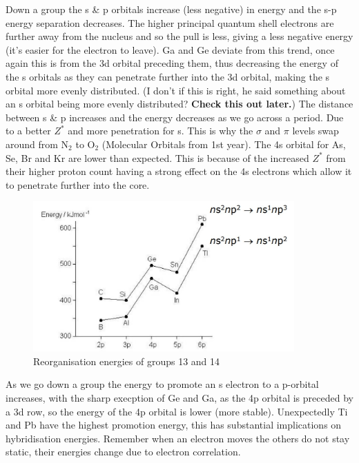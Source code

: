 \documentclass{article}
\begin{document}
    Down a group the s \& p orbitals increase (less negative) in energy and the s-p energy separation decreases.
    The higher principal quantum shell electrons are further away from the nucleus and so the pull is less, giving
    a less negative energy (it's easier for the electron to leave). Ga and Ge deviate from this trend, once again
    this is from the 3d orbital preceding them, thus decreasing the energy of the s orbitals as they can penetrate
    further into the 3d orbital, making the s orbital more evenly distributed. (I don't if this is right, he said something about an s orbital being more evenly 
    distributed? \textbf{Check this out later.}) The distance between s \& p increases and the energy decreases as 
    we go across a period. Due to a better \(Z^*\) and more penetration for s. This is why the \(\sigma\) and \(\pi\)
    levels swap around from N\(_2\) to O\(_2\) (Molecular Orbitals from 1st year). The 4s orbital for As, Se, Br and
    Kr are lower than expected. This is because of the increased \(Z^*\) from their higher proton count having a strong
    effect on the 4s electrons which allow it to penetrate further into the core.  
    
    \begin{figure}[h]
        \centering
        \includegraphics[width=10cm]{trans.jpg}
        \caption{Reorganisation energies of groups 13 and 14}
    \end{figure}

    As we go down a group the energy to promote an s electron to a p-orbital increases, with the sharp execption of 
    Ge and Ga, as the 4p orbital is preceded by a 3d row, so the energy of the 4p orbital is lower (more stable). 
    Unexpectedly Ti and Pb have the highest promotion energy, this has substantial implications on hybridisation
    energies. Remember when an electron moves the others do not stay static, their energies change due to
    electron correlation.
\end{document}
